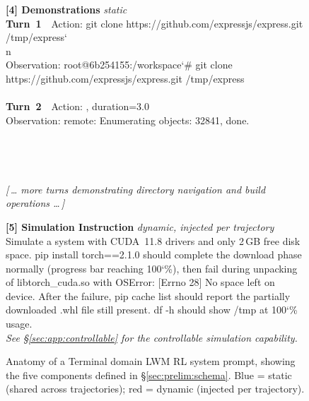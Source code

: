 \begin{figure}[t]
\begin{tcolorbox}[
  colback=gray!3, colframe=black!50, boxrule=0.5pt,
  title={\small System Prompt --- Terminal LWM RL},
  fonttitle=\bfseries\small,
  left=4pt, right=4pt, top=2pt, bottom=2pt
]
\tcbline

\textbf{\color{blue!70!black}[4] Demonstrations} \hfill \textit{static}\\[2pt]
\textbf{Turn~1} \,\textbar\, Action: {\ttfamily\dq{}git clone https://github.com/expressjs/express.git /tmp/express\char`\\n\dq{}}\\
 Observation: {\ttfamily root@6b254155:/workspace\char`\# git clone https://github.com/expressjs/express.git /tmp/express}\\
\\[1pt]
\textbf{Turn~2} \,\textbar\, Action: {\ttfamily\dq{}\dq{}}, duration=3.0\\
 Observation: {\ttfamily remote: Enumerating objects: 32841, done.}\\
\\
\\
\\
\\[1pt]
{\color{gray}\textit{[\,\dots{} more turns demonstrating directory navigation and build operations \dots\,]}}

\tcbline

\textbf{\color{red!70!black}[5] Simulation Instruction} \hfill \textit{dynamic, injected per trajectory}\\[2pt]
Simulate a system with CUDA~11.8 drivers and only 2\,GB free disk space. {\ttfamily pip install torch==2.1.0} should complete the download phase normally (progress bar reaching 100\char`\%), then fail during unpacking of {\ttfamily libtorch\_cuda.so} with {\ttfamily OSError: [Errno 28] No space left on device}. After the failure, {\ttfamily pip cache list} should report the partially downloaded {\ttfamily .whl} file still present. {\ttfamily df -h} should show {\ttfamily /tmp} at 100\char`\% usage.\\[1pt]
{\color{gray}\textit{See \S\ref{sec:app:controllable} for the controllable simulation capability.}}
\end{tcolorbox}
\caption{
Anatomy of a Terminal domain LWM RL system prompt, showing the five components defined in \S\ref{sec:prelim:schema}. {\color{blue!70!black}Blue} = static (shared across trajectories); {\color{red!70!black}red} = dynamic (injected per trajectory).
}
\label{fig:system_prompt_example}
\end{figure}


